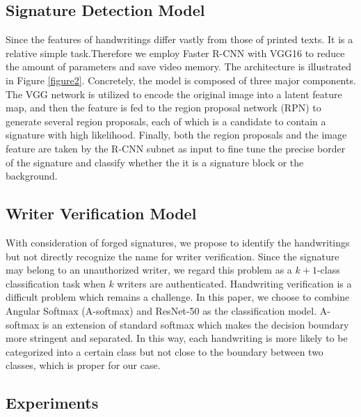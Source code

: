 \documentclass[sigconf]{acmart}
\begin{document}
\subsection{Signature Detection Model}
Since the features of handwritings differ vastly from those of printed texts. It is a relative simple task.Therefore we employ Faster R-CNN \cite{ren2015faster} with VGG16 \cite{simonyan2014very} to reduce the amount of parameters and save video memory. The architecture is illustrated in Figure \ref{figure2}. Concretely, the model is composed of three major components. The VGG network is utilized to encode the original image into a latent feature map, and then the feature is fed to the region proposal network (RPN) to generate several region proposals, each of which is a candidate to contain a signature with high likelihood. Finally, both the region proposals and the image feature are taken by the R-CNN subnet as input to fine tune the precise border of the signature and classify whether the it is a signature block or the background.

\subsection{Writer Verification Model}
With consideration of forged signatures, we propose to identify the handwritings but not directly recognize the name for writer verification. Since the signature may belong to an unauthorized writer, we regard this problem as a $k+1$-class classification task when $k$ writers are authenticated. Handwriting verification is a difficult problem which remains a challenge. In this paper, we choose to combine Angular Softmax (A-softmax) \cite{liu2017sphereface} and ResNet-50 \cite{he2016deep} as the classification model. A-softmax is an extension of standard softmax which makes the decision boundary more stringent and separated. In this way, each handwriting is more likely to be categorized into a certain class but not close to the boundary between two classes, which is proper for our case. 

\subsection{Experiments}
\end{document}
